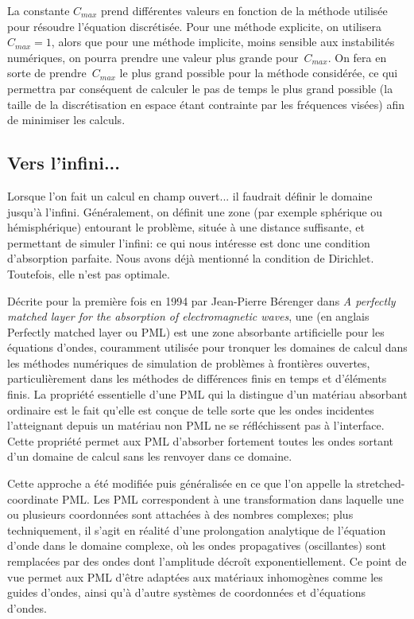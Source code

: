 La constante $C_{max}$ prend différentes valeurs en fonction de la méthode utilisée pour résoudre l'équation discrétisée.
Pour une méthode explicite, on utilisera $C_{max} = 1$, alors que pour une méthode implicite, moins sensible aux instabilités numériques, on pourra prendre une valeur plus grande pour~$C_{max}$.
On fera en sorte de prendre~$C_{max}$ le plus grand possible pour la méthode considérée, ce qui permettra par conséquent de calculer le pas de temps le plus grand possible (la taille de la discrétisation en espace étant contrainte par les fréquences visées) afin de minimiser les calculs.


\medskip
\subsection{Vers l'infini...}

Lorsque l'on fait un calcul en champ ouvert... il faudrait définir le domaine jusqu'à l'infini.
Généralement, on définit une zone (par exemple sphérique ou hémisphérique) entourant le problème, située à une distance suffisante, et permettant de simuler l'infini: ce qui nous intéresse est donc une condition d'absorption parfaite.
Nous avons déjà mentionné la condition de Dirichlet.
Toutefois, elle n'est pas optimale.

Décrite pour la première fois en 1994 par Jean-Pierre Bérenger dans \emph{A perfectly matched layer for the absorption of electromagnetic waves}, une  (en anglais Perfectly matched layer ou PML) est une zone absorbante artificielle pour les équations d'ondes, couramment utilisée pour tronquer les domaines de calcul dans les méthodes numériques de simulation de problèmes à frontières ouvertes, particulièrement dans les méthodes de différences finis en temps et d'éléments finis.
La propriété essentielle d'une PML qui la distingue d'un matériau absorbant ordinaire est le fait qu'elle est conçue de telle sorte que les ondes incidentes l'atteignant depuis un matériau non PML ne se réfléchissent pas à l'interface. Cette propriété permet aux PML d'absorber fortement toutes les ondes sortant d'un domaine de calcul sans les renvoyer dans ce domaine.

Cette approche a été modifiée puis généralisée en ce que l'on appelle la stretched-coordinate PML. Les PML correspondent à une transformation dans laquelle une ou plusieurs coordonnées sont attachées à des nombres complexes; plus techniquement, il s'agit en réalité d'une prolongation analytique de l'équation d'onde dans le domaine complexe, où les ondes propagatives (oscillantes) sont remplacées par des ondes dont l'amplitude décroît exponentiellement. Ce point de vue permet aux PML d'être adaptées aux matériaux inhomogènes comme les guides d'ondes, ainsi qu'à d'autre systèmes de coordonnées et d'équations d'ondes.

